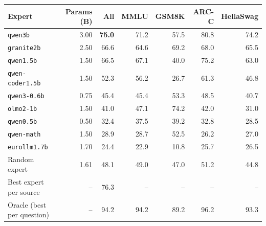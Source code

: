 \begin{tabular}{lrrrrrr}
\toprule
Expert & Params (B) & All & MMLU & GSM8K & ARC-C & HellaSwag \\
\midrule
\texttt{qwen3b} & 3.00 & \textbf{75.0} & 71.2 & 57.5 & 80.8 & 74.2 \\
\texttt{granite2b} & 2.50 & 66.6 & 64.6 & 69.2 & 68.0 & 65.5 \\
\texttt{qwen1.5b} & 1.50 & 66.5 & 67.1 & 40.0 & 75.2 & 63.0 \\
\texttt{qwen-coder1.5b} & 1.50 & 52.3 & 56.2 & 26.7 & 61.3 & 46.8 \\
\texttt{qwen3-0.6b} & 0.75 & 45.4 & 45.4 & 53.3 & 48.5 & 40.7 \\
\texttt{olmo2-1b} & 1.50 & 41.0 & 47.1 & 74.2 & 42.0 & 31.0 \\
\texttt{qwen0.5b} & 0.50 & 32.4 & 37.5 & 39.2 & 32.8 & 28.5 \\
\texttt{qwen-math} & 1.50 & 28.9 & 28.7 & 52.5 & 26.2 & 27.0 \\
\texttt{eurollm1.7b} & 1.70 & 24.4 & 22.9 & 10.8 & 25.7 & 26.5 \\
\midrule
Random expert & 1.61 & 48.1 & 49.0 & 47.0 & 51.2 & 44.8 \\
Best expert per source & -- & 76.3 & -- & -- & -- & -- \\
Oracle (best per question) & -- & 94.2 & 94.2 & 89.2 & 96.2 & 93.3 \\
\bottomrule
\end{tabular}
